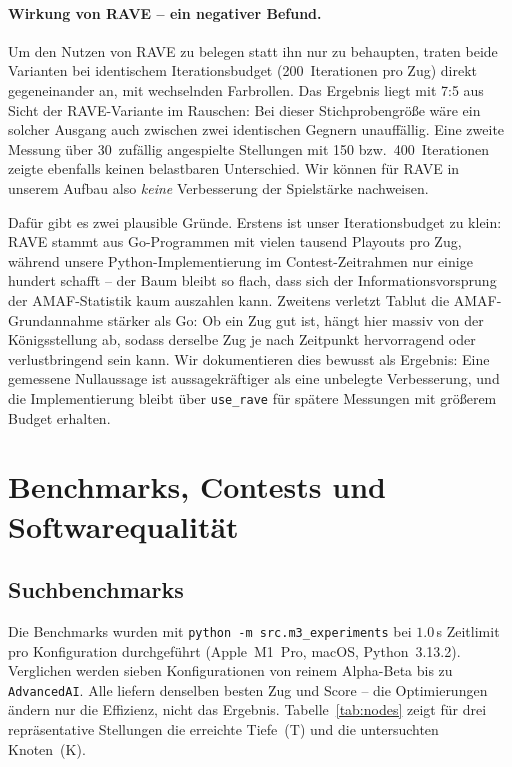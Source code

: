 \documentclass[11pt,a4paper]{article}
\newcommand{\code}[1]{\texttt{\small #1}}
\begin{document}
\paragraph{Wirkung von RAVE -- ein negativer Befund.}
Um den Nutzen von RAVE zu belegen statt ihn nur zu behaupten, traten beide
Varianten bei identischem Iterationsbudget (200~Iterationen pro Zug) direkt
gegeneinander an, mit wechselnden Farbrollen.
Das Ergebnis liegt mit 7:5 aus Sicht der RAVE-Variante im Rauschen: Bei dieser
Stichprobengr\"o\ss e w\"are ein solcher Ausgang auch zwischen zwei identischen
Gegnern unauff\"allig.
Eine zweite Messung \"uber 30~zuf\"allig angespielte Stellungen mit 150 bzw.\
400~Iterationen zeigte ebenfalls keinen belastbaren Unterschied.
Wir k\"onnen f\"ur RAVE in unserem Aufbau also \emph{keine} Verbesserung der
Spielst\"arke nachweisen.

Daf\"ur gibt es zwei plausible Gr\"unde.
Erstens ist unser Iterationsbudget zu klein: RAVE stammt aus Go-Programmen mit
vielen tausend Playouts pro Zug, w\"ahrend unsere Python-Implementierung im
Contest-Zeitrahmen nur einige hundert schafft -- der Baum bleibt so flach, dass
sich der Informationsvorsprung der AMAF-Statistik kaum auszahlen kann.
Zweitens verletzt Tablut die AMAF-Grundannahme st\"arker als Go: Ob ein Zug gut
ist, h\"angt hier massiv von der K\"onigsstellung ab, sodass derselbe Zug je nach
Zeitpunkt hervorragend oder verlustbringend sein kann.
Wir dokumentieren dies bewusst als Ergebnis: Eine gemessene Nullaussage ist
aussagekr\"aftiger als eine unbelegte Verbesserung, und die Implementierung
bleibt \"uber \code{use\_rave} f\"ur sp\"atere Messungen mit gr\"o\ss erem
Budget erhalten.

\section{Benchmarks, Contests und Softwarequalit\"at}\label{sec:results}

\subsection{Suchbenchmarks}
Die Benchmarks wurden mit \code{python -m src.m3\_experiments} bei $1.0$\,s
Zeitlimit pro Konfiguration durchgef\"uhrt (Apple~M1~Pro, macOS, Python~3.13.2).
Verglichen werden sieben Konfigurationen von reinem Alpha-Beta bis zu
\code{AdvancedAI}.
Alle liefern denselben besten Zug und Score -- die Optimierungen \"andern nur die
Effizienz, nicht das Ergebnis.
Tabelle~\ref{tab:nodes} zeigt f\"ur drei repr\"asentative Stellungen die erreichte
Tiefe~(T) und die untersuchten Knoten~(K).
\end{document}
